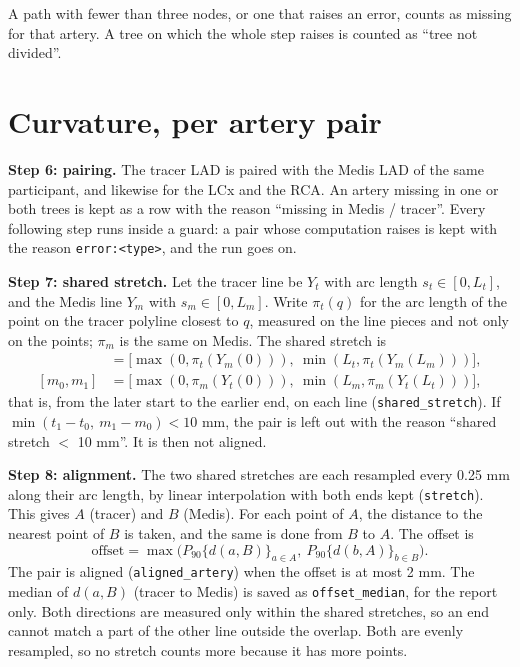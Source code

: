 \documentclass[11pt,a4paper]{article}
\newcommand{\code}[1]{\texttt{#1}}
\begin{document}
A path with fewer than three nodes, or one that raises an error, counts as missing for that artery. A
tree on which the whole step raises is counted as ``tree not divided''.

\section{Curvature, per artery pair}

\textbf{Step 6: pairing.} The tracer LAD is paired with the Medis LAD of the same participant, and
likewise for the LCx and the RCA. An artery missing in one or both trees is kept as a row with the reason
``missing in Medis / tracer''. Every following step runs inside a guard: a pair whose computation raises
is kept with the reason \code{error:<type>}, and the run goes on.

\textbf{Step 7: shared stretch.} Let the tracer line be $Y_t$ with arc length $s_t\in[0,L_t]$, and the
Medis line $Y_m$ with $s_m\in[0,L_m]$. Write $\pi_t(q)$ for the arc length of the point on the tracer
polyline closest to $q$, measured on the line pieces and not only on the points; $\pi_m$ is the same on
Medis. The shared stretch is
\begin{align*}
[t_0,t_1]&=\bigl[\max(0,\pi_t(Y_m(0))),\ \min(L_t,\pi_t(Y_m(L_m)))\bigr],\\
[m_0,m_1]&=\bigl[\max(0,\pi_m(Y_t(0))),\ \min(L_m,\pi_m(Y_t(L_t)))\bigr],
\end{align*}
that is, from the later start to the earlier end, on each line (\code{shared\_stretch}). If
$\min(t_1-t_0,\ m_1-m_0)<10$ mm, the pair is left out with the reason ``shared stretch $<$ 10 mm''. It is
then not aligned.

\textbf{Step 8: alignment.} The two shared stretches are each resampled every 0.25 mm along their arc
length, by linear interpolation with both ends kept (\code{stretch}). This gives $A$ (tracer) and $B$
(Medis). For each point of $A$, the distance to the nearest point of $B$ is taken, and the same is done
from $B$ to $A$. The offset is
\[
\text{offset}=\max\bigl(P_{90}\{d(a,B)\}_{a\in A},\ P_{90}\{d(b,A)\}_{b\in B}\bigr).
\]
The pair is aligned (\code{aligned\_artery}) when the offset is at most 2 mm. The median of $d(a,B)$
(tracer to Medis) is saved as \code{offset\_median}, for the report only. Both directions are measured
only within the shared stretches, so an end cannot match a part of the other line outside the overlap.
Both are evenly resampled, so no stretch counts more because it has more points.
\end{document}
